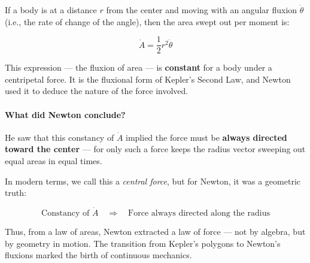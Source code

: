 If a body is at a distance $r$ from the center and moving with an angular fluxion $\dot{\theta}$ (i.e., the rate of change of the angle), then the area swept out per moment is:

\[
\dot{A} = \frac{1}{2} r^2 \dot{\theta}
\]

This expression — the fluxion of area — is \textbf{constant} for a body under a centripetal force. It is the fluxional form of Kepler’s Second Law, and Newton used it to deduce the nature of the force involved.

\paragraph{What did Newton conclude?}

He saw that this constancy of $\dot{A}$ implied the force must be \textbf{always directed toward the center} — for only such a force keeps the radius vector sweeping out equal areas in equal times.

In modern terms, we call this a \textit{central force}, but for Newton, it was a geometric truth:

\[
\text{Constancy of } \dot{A} \quad \Rightarrow \quad \text{Force always directed along the radius}
\]

Thus, from a law of areas, Newton extracted a law of force — not by algebra, but by geometry in motion. The transition from Kepler’s polygons to Newton’s fluxions marked the birth of continuous mechanics.
